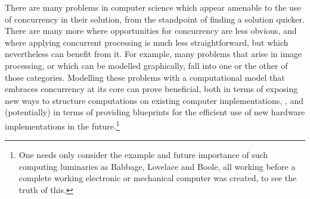 


There are many problems in computer science which appear amenable to the use of concurrency in their solution, from the standpoint of finding a solution quicker.  There are many more where opportunities for concurrency are less obvious, and where applying concurrent processing is much less straightforward, but which nevertheless can benefit from it.  For example, many problems that arise in image processing, or which can be modelled graphically, fall into one or the other of those categories.  Modelling these problems with a computational model that embraces concurrency at its core can prove beneficial, both in terms of exposing new ways to structure computations on existing computer implementations, \eg{} \cite{GimelFarb2013a,Nicolescu2014b}, and (potentially) in terms of providing blueprints for the efficient use of new hardware implementations in the future.\footnote{One needs only consider the example and future importance of such computing luminaries as Babbage, Lovelace and Boole, all working before a complete working electronic or mechanical computer was created, to see the truth of this.}

